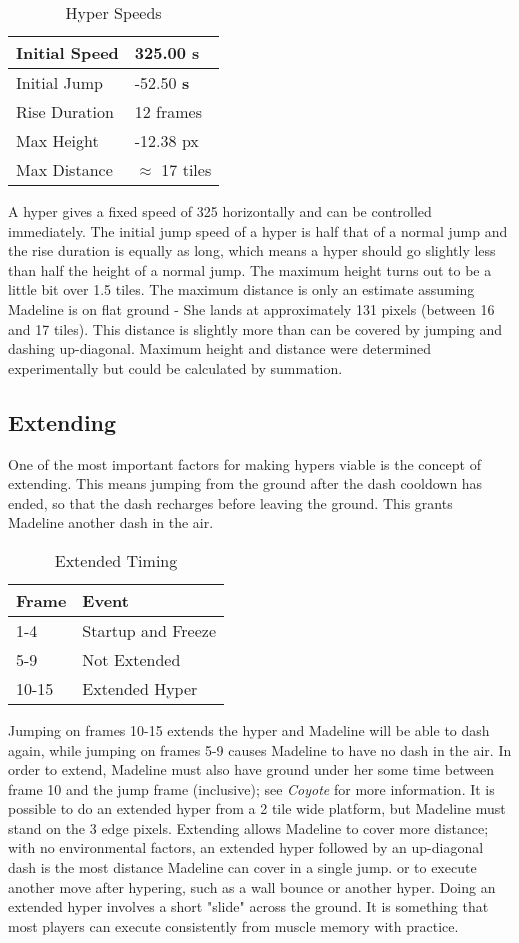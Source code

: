 \documentclass[oneside]{book}
\newcommand{\s}{\textbf{s}}
\begin{document}
\begin{table}[h]
\begin{tabular}{|l|l|}
\hline
Initial Speed&325.00 \s\\
\hline
Initial Jump&-52.50 \s\\
\hline
Rise Duration&12 frames\\
\hline
Max Height&-12.38 px\\
\hline
Max Distance&$\approx$ 17 tiles\\
\hline
\end{tabular}
\caption{Hyper Speeds}
\end{table}

A hyper gives a fixed speed of 325 horizontally and can be controlled immediately. The initial jump speed of a hyper is half that of a normal jump and the rise duration is equally as long, which means a hyper should go slightly less than half the height of a normal jump. The maximum height turns out to be a little bit over 1.5 tiles. The maximum distance is only an estimate assuming Madeline is on flat ground - She lands at approximately 131 pixels (between 16 and 17 tiles). This distance is slightly more than can be covered by jumping and dashing up-diagonal. Maximum height and distance were determined experimentally but could be calculated by summation.

\subsection{Extending}

One of the most important factors for making hypers viable is the concept of extending. This means jumping from the ground after the dash cooldown has ended, so that the dash recharges before leaving the ground. This grants Madeline another dash in the air.

\begin{table}[h]
\begin{tabular}{|l|l|}
\hline
Frame&Event\\
\hline
1-4&Startup and Freeze\\
\hline
5-9&Not Extended\\
\hline
10-15&Extended Hyper\\
\hline
\end{tabular}
\caption{Extended Timing}
\end{table}

Jumping on frames 10-15 extends the hyper and Madeline will be able to dash again, while jumping on frames 5-9 causes Madeline to have no dash in the air. In order to extend, Madeline must also have ground under her some time between frame 10 and the jump frame (inclusive); see \textit{Coyote} for more information. It is possible to do an extended hyper from a 2 tile wide platform, but Madeline must stand on the 3 edge pixels. Extending allows Madeline to cover more distance; with no environmental factors, an extended hyper followed by an up-diagonal dash is the most distance Madeline can cover in a single jump. or to execute another move after hypering, such as a wall bounce or another hyper. Doing an extended hyper involves a short "slide" across the ground. It is something that most players can execute consistently from muscle memory with practice.
\end{document}
